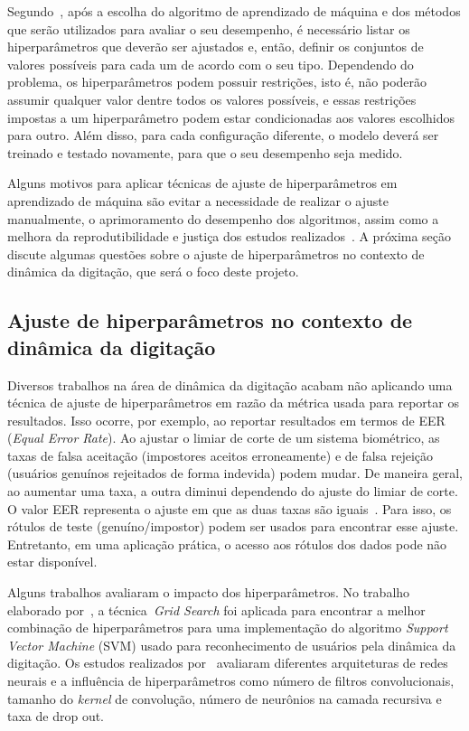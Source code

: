 Segundo~, após a escolha do algoritmo de aprendizado de máquina e dos métodos que serão utilizados para avaliar o seu desempenho, é necessário listar os hiperparâmetros que deverão ser ajustados e, então, definir os conjuntos de valores possíveis para cada um de acordo com o seu tipo. Dependendo do problema, os hiperparâmetros podem possuir restrições, isto é, não poderão assumir qualquer valor dentre todos os valores possíveis, e essas restrições impostas a um hiperparâmetro podem estar condicionadas aos valores escolhidos para outro. Além disso, para cada configuração diferente, o modelo deverá ser treinado e testado novamente, para que o seu desempenho seja medido.

Alguns motivos para aplicar técnicas de ajuste de hiperparâmetros em aprendizado de máquina são evitar a necessidade de realizar o ajuste manualmente, o aprimoramento do desempenho dos algoritmos, assim como a melhora da reprodutibilidade e justiça dos estudos realizados~. A próxima seção discute algumas questões sobre o ajuste de hiperparâmetros no contexto de dinâmica da digitação, que será o foco deste projeto.


\subsection{Ajuste de hiperparâmetros no contexto de dinâmica da digitação}\label{trabalhos_relacionados}

Diversos trabalhos na área de dinâmica da digitação acabam não aplicando uma técnica de ajuste de hiperparâmetros em razão da métrica usada para reportar os resultados. Isso ocorre, por exemplo, ao reportar resultados em termos de EER (\textit{Equal Error Rate}). Ao ajustar o limiar de corte de um sistema biométrico, as taxas de falsa aceitação (impostores aceitos erroneamente) e de falsa rejeição (usuários genuínos rejeitados de forma indevida) podem mudar. De maneira geral, ao aumentar uma taxa, a outra diminui dependendo do ajuste do limiar de corte. O valor EER representa o ajuste em que as duas taxas são iguais~\cite{Roy2022systematic}. Para isso, os rótulos de teste (genuíno/impostor) podem ser usados para encontrar esse ajuste. Entretanto, em uma aplicação prática, o acesso aos rótulos dos dados pode não estar disponível.

Alguns trabalhos avaliaram o impacto dos hiperparâmetros. No trabalho elaborado por~, a técnica~\textit{Grid Search} foi aplicada para encontrar a melhor combinação de hiperparâmetros para uma implementação do algoritmo \textit{Support Vector Machine} (SVM) usado para reconhecimento de usuários pela dinâmica da digitação. Os estudos realizados por~ avaliaram diferentes arquiteturas de redes neurais e a influência de hiperparâmetros como número de filtros convolucionais, tamanho do \textit{kernel} de convolução, número de neurônios na camada recursiva e taxa de drop out.


